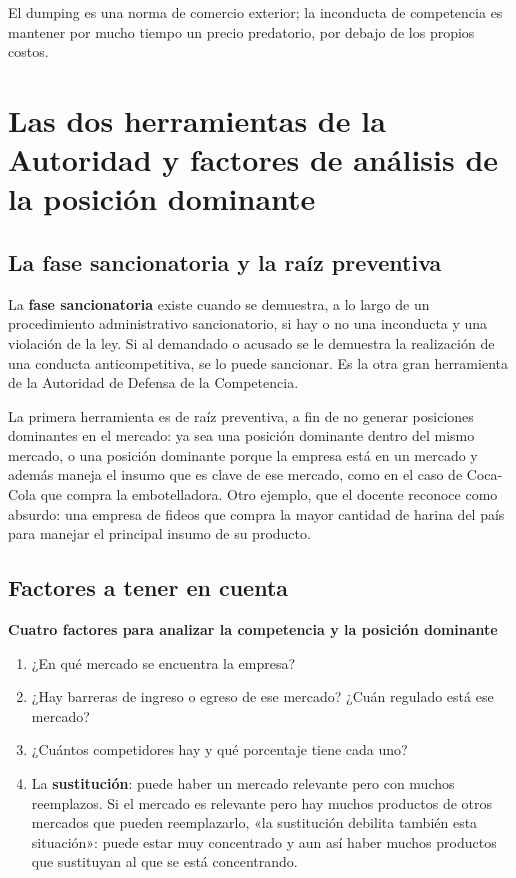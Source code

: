 \documentclass[12pt,oneside]{book}
\begin{document}
El dumping es una norma de comercio exterior; la inconducta de competencia es mantener por mucho tiempo un precio predatorio, por debajo de los propios costos.

\section{Las dos herramientas de la Autoridad y factores de análisis de la posición dominante}

\subsection{La fase sancionatoria y la raíz preventiva}

La \textbf{fase sancionatoria} existe cuando se demuestra, a lo largo de un procedimiento administrativo sancionatorio, si hay o no una inconducta y una violación de la ley. Si al demandado o acusado se le demuestra la realización de una conducta anticompetitiva, se lo puede sancionar. Es la otra gran herramienta de la Autoridad de Defensa de la Competencia.

La primera herramienta es de raíz preventiva, a fin de no generar posiciones dominantes en el mercado: ya sea una posición dominante dentro del mismo mercado, o una posición dominante porque la empresa está en un mercado y además maneja el insumo que es clave de ese mercado, como en el caso de Coca-Cola que compra la embotelladora. Otro ejemplo, que el docente reconoce como absurdo: una empresa de fideos que compra la mayor cantidad de harina del país para manejar el principal insumo de su producto.

\subsection{Factores a tener en cuenta}

\begin{important}
\textbf{Cuatro factores para analizar la competencia y la posición dominante}
\begin{enumerate}
    \item ¿En qué mercado se encuentra la empresa?
    \item ¿Hay barreras de ingreso o egreso de ese mercado? ¿Cuán regulado está ese mercado?
    \item ¿Cuántos competidores hay y qué porcentaje tiene cada uno?
    \item La \textbf{sustitución}: puede haber un mercado relevante pero con muchos reemplazos. Si el mercado es relevante pero hay muchos productos de otros mercados que pueden reemplazarlo, «la sustitución debilita también esta situación»: puede estar muy concentrado y aun así haber muchos productos que sustituyan al que se está concentrando.
\end{enumerate}
\end{important}
\end{document}
